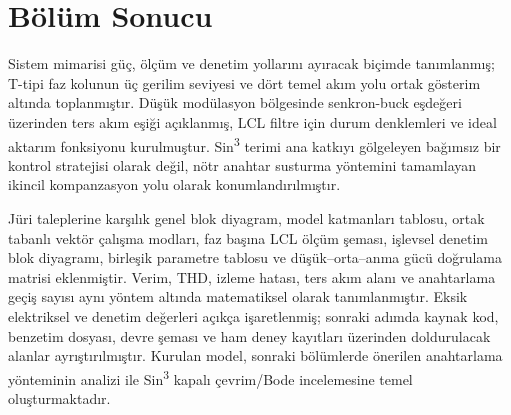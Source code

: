 \section{Bölüm Sonucu}

Sistem mimarisi güç, ölçüm ve denetim yollarını ayıracak biçimde tanımlanmış; T-tipi faz kolunun üç gerilim seviyesi ve dört temel akım yolu ortak gösterim altında toplanmıştır. Düşük modülasyon bölgesinde senkron-buck eşdeğeri üzerinden ters akım eşiği açıklanmış, LCL filtre için durum denklemleri ve ideal aktarım fonksiyonu kurulmuştur. Sin\textsuperscript{3} terimi ana katkıyı gölgeleyen bağımsız bir kontrol stratejisi olarak değil, nötr anahtar susturma yöntemini tamamlayan ikincil kompanzasyon yolu olarak konumlandırılmıştır.

Jüri taleplerine karşılık genel blok diyagram, model katmanları tablosu, ortak tabanlı vektör çalışma modları, faz başına LCL ölçüm şeması, işlevsel denetim blok diyagramı, birleşik parametre tablosu ve düşük--orta--anma gücü doğrulama matrisi eklenmiştir. Verim, THD, izleme hatası, ters akım alanı ve anahtarlama geçiş sayısı aynı yöntem altında matematiksel olarak tanımlanmıştır. Eksik elektriksel ve denetim değerleri açıkça işaretlenmiş; sonraki adımda kaynak kod, benzetim dosyası, devre şeması ve ham deney kayıtları üzerinden doldurulacak alanlar ayrıştırılmıştır. Kurulan model, sonraki bölümlerde önerilen anahtarlama yönteminin analizi ile Sin\textsuperscript{3} kapalı çevrim/Bode incelemesine temel oluşturmaktadır.
